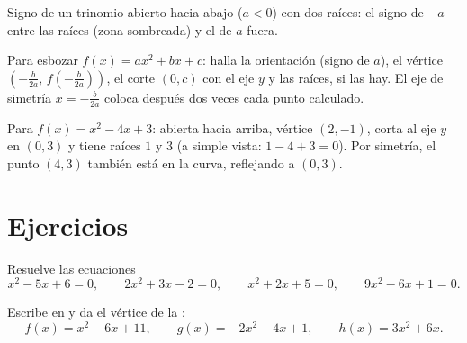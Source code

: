 \begin{omfigure}

{\small Signo de un trinomio abierto hacia abajo ($a < 0$) con dos raíces:
el signo de $-a$ entre las raíces (zona sombreada) y el de $a$ fuera.}
\end{omfigure}

\begin{method}\label{met:g11:quad:reading}
Para esbozar $f(x) = ax^2+bx+c$: halla la orientación (signo de $a$), el
vértice $\left(-\frac{b}{2a},\, f\!\left(-\frac{b}{2a}\right)\right)$, el
corte $(0, c)$ con el eje $y$ y las raíces, si las hay. El eje de simetría
$x = -\frac{b}{2a}$ coloca después dos veces cada punto calculado.
\end{method}

\begin{example}
Para $f(x) = x^2 - 4x + 3$: abierta hacia arriba, vértice $(2, -1)$, corta
al eje $y$ en $(0,3)$ y tiene raíces $1$ y $3$ (a simple vista:
$1 - 4 + 3 = 0$). Por simetría, el punto $(4, 3)$ también está en la
curva, reflejando a $(0, 3)$.
\end{example}

\section{Ejercicios}

\begin{exercise}[$\star$]\label{exo:g11:quad:1}
Resuelve las ecuaciones
\[
x^2 - 5x + 6 = 0, \qquad
2x^2 + 3x - 2 = 0, \qquad
x^2 + 2x + 5 = 0, \qquad
9x^2 - 6x + 1 = 0 .
\]
\end{exercise}

\begin{exercise}[$\star$]\label{exo:g11:quad:2}
Escribe en  y da el vértice de la :
\[
f(x) = x^2 - 6x + 11, \qquad
g(x) = -2x^2 + 4x + 1, \qquad
h(x) = 3x^2 + 6x .
\]
\end{exercise}

